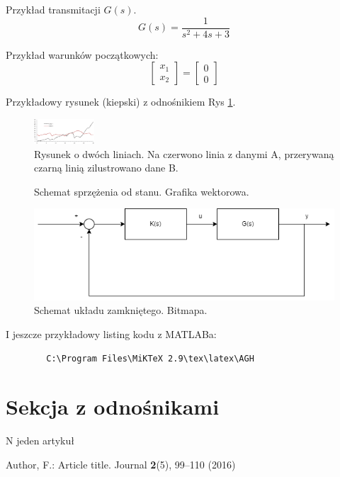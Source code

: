 \documentclass{sprawozdanie-agh}
\begin{document}
Przykład transmitacji $G(s)$.
        \begin{equation} 
            G(s) = \frac{1}{s^2+4s+3}
	\end{equation}

 Przykład warunków początkowych:
    \begin{equation} 
        \begin{bmatrix} 
            {x}_1 \\ {x}_2 
        \end{bmatrix} = 
        \begin{bmatrix} 0 \\ 
                        0 
        \end{bmatrix}
    \end{equation}

Przykładowy rysunek (kiepski) z odnośnikiem Rys \ref{fig1}.

    \begin{figure}[h]
    \centering
        \includegraphics[width=0.2\textwidth]{fig1.eps}
        \caption{Rysunek o dwóch liniach. Na czerwono linia z danymi A, przerywaną czarną linią zilustrowano dane B.} \label{fig1}
    \end{figure}

    \begin{figure}[h!]
        \centering
        
        \caption{Schemat sprzężenia od stanu. Grafika wektorowa.}
        \label{figtest}
    \end{figure}

    \begin{figure}[h!]
        \centering
        \includegraphics[width=12cm]{images/ClosedLoop.png}
        \caption{Schemat układu zamkniętego. Bitmapa.}
        \label{figtest}
    \end{figure}

I jeszcze przykładowy listing kodu z MATLABa:
    \begin{lstlisting}
        C:\Program Files\MiKTeX 2.9\tex\latex\AGH
    \end{lstlisting}

\section{Sekcja z odnośnikami}

N jeden artykuł \cite{ref_article1}



\begin{thebibliography}{8}
Author, F.: Article title. Journal \textbf{2}(5), 99--110 (2016)
\end{thebibliography}

\end{document}
